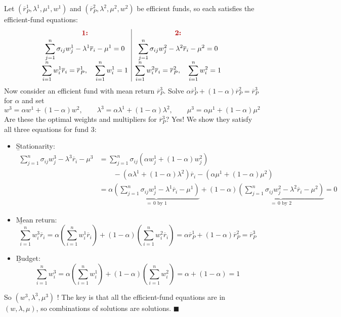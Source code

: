 Let $(\overline{r}_P^1, \lambda^1, \mu^1, w^1)$ and $(\overline{r}_P^2, \lambda^2, \mu^2, w^2)$ be efficient funds, so each satisfies the efficient-fund equations:
\[\begin{array}{c|c}
    \textcolor{red!70!black}{\textbf{1:}} & \textcolor{red!70!black}{\textbf{2:}}\\[2pt]
    \displaystyle\sum_{j=1}^{n}\sigma_{ij}w_j^1 - \lambda^1\overline{r}_i - \mu^1 = 0 & \displaystyle\sum_{j=1}^{n}\sigma_{ij}w_j^2 - \lambda^2\overline{r}_i - \mu^2 = 0\\[10pt]
    \displaystyle\sum_{i=1}^{n}w_i^1\overline{r}_i = \overline{r}_P^1, \quad \sum_{i=1}^{n}w_i^1 = 1 & \displaystyle\sum_{i=1}^{n}w_i^2\overline{r}_i = \overline{r}_P^2, \quad \sum_{i=1}^{n}w_i^2 = 1
\end{array}\]
Now consider an efficient fund with mean return $\overline{r}_P^3$. Solve $\alpha\overline{r}_P^1 + (1-\alpha)\overline{r}_P^2 = \overline{r}_P^3$ for $\alpha$ and set
\[w^3 = \alpha w^1 + (1-\alpha)w^2, \qquad \lambda^3 = \alpha\lambda^1 + (1-\alpha)\lambda^2, \qquad \mu^3 = \alpha\mu^1 + (1-\alpha)\mu^2\]
Are these the optimal weights and multipliers for $\overline{r}_P^3$? Yes! We show they satisfy all three equations for fund 3:
\begin{itemize}
    \item \b{Stationarity}:
    \begin{align*}
        \sum_{j=1}^{n}\sigma_{ij}w_j^3 - \lambda^3\overline{r}_i - \mu^3 &= \sum_{j=1}^{n}\sigma_{ij}\left(\alpha w_j^1 + (1-\alpha)w_j^2\right)\\
        &\qquad - \left(\alpha\lambda^1 + (1-\alpha)\lambda^2\right)\overline{r}_i - \left(\alpha\mu^1 + (1-\alpha)\mu^2\right)\\
        &= \alpha\underbrace{\left(\sum_{j=1}^{n}\sigma_{ij}w_j^1 - \lambda^1\overline{r}_i - \mu^1\right)}_{=\,0 \text{ by } 1} + (1-\alpha)\underbrace{\left(\sum_{j=1}^{n}\sigma_{ij}w_j^2 - \lambda^2\overline{r}_i - \mu^2\right)}_{=\,0 \text{ by } 2} = 0
    \end{align*}
    \item \b{Mean return}:
    \[\sum_{i=1}^{n}w_i^3\overline{r}_i = \alpha\left(\sum_{i=1}^{n}w_i^1\overline{r}_i\right) + (1-\alpha)\left(\sum_{i=1}^{n}w_i^2\overline{r}_i\right) = \alpha\overline{r}_P^1 + (1-\alpha)\overline{r}_P^2 = \overline{r}_P^3\]
    \item \b{Budget}:
    \[\sum_{i=1}^{n}w_i^3 = \alpha\left(\sum_{i=1}^{n}w_i^1\right) + (1-\alpha)\left(\sum_{i=1}^{n}w_i^2\right) = \alpha + (1-\alpha) = 1\]
\end{itemize}
So $(w^3, \lambda^3, \mu^3)$ ! The key is that all the efficient-fund equations are  in $(w, \lambda, \mu)$, so combinations of solutions are solutions. \hfill$\blacksquare$

